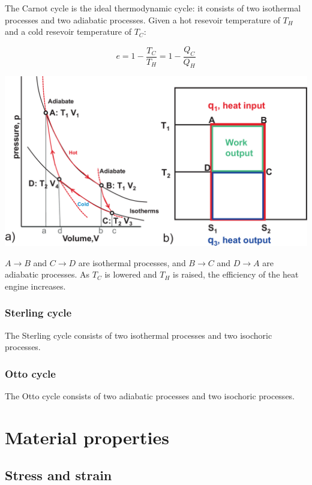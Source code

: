 \documentclass[12pt]{article}
\begin{document}
The Carnot cycle is the ideal thermodynamic cycle: it consists of two isothermal processes and two adiabatic processes.
Given a hot resevoir temperature of $T_H$ and a cold resevoir temperature of $T_C$:

\[
\boxed{
e = 1 - \frac{T_C}{T_H} = 1 - \frac{Q_C}{Q_H}
}
\]

\includegraphics[width = 6.5in]{carnot_cycle_pv_ts.png}

$A \longrightarrow B$ and $C \longrightarrow D$ are isothermal processes, and $B \longrightarrow C$ and $D \longrightarrow A$ are adiabatic processes.
As $T_C$ is lowered and $T_H$ is raised, the efficiency of the heat engine increases.

\subsubsection{Sterling cycle}

The Sterling cycle consists of two isothermal processes and two isochoric processes.

\subsubsection{Otto cycle}

The Otto cycle consists of two adiabatic processes and two isochoric processes.

\newpage

\section{Material properties}

\subsection{Stress and strain}
\end{document}
